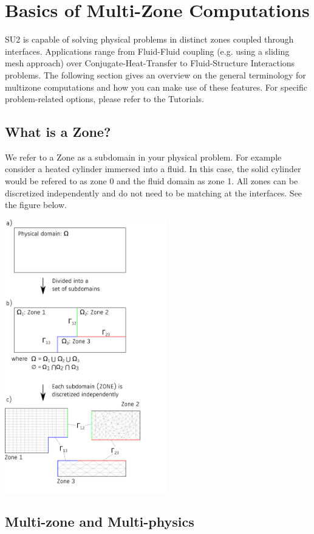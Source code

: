 \documentclass[12pt, a4paper, twoside]{article}
\begin{document}
\newpage
\section{Basics of Multi-Zone Computations}
SU2 is capable of solving physical problems in distinct zones coupled through interfaces. Applications range from Fluid-Fluid coupling (e.g. using a sliding mesh approach) over Conjugate-Heat-Transfer to Fluid-Structure Interactions problems. The following section gives an overview on the general terminology for multizone computations and how you can make use of these features. For specific problem-related options, please refer to the Tutorials.

\subsection{What is a Zone?}
We refer to a Zone as a subdomain in your physical problem. For example consider a heated cylinder immersed into a fluid. In this case, the solid cylinder would be refered to as zone 0 and the fluid domain as zone 1. All zones can be discretized independently and do not need to be matching at the interfaces. See the figure below.

\begin{center}
    \includegraphics[width=7cm]{Figures/zones.png}
\end{center}

\subsection{Multi-zone and Multi-physics}
\end{document}
